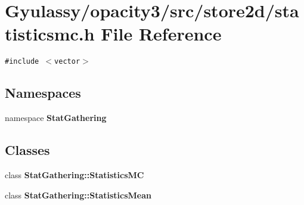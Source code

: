 \section{Gyulassy/opacity3/src/store2d/statisticsmc.h File Reference}
\label{statisticsmc_8h}
{\tt \#include $<$vector$>$}\par
\subsection*{Namespaces}
\begin{CompactItemize}
\item 
namespace {\bf StatGathering}
\end{CompactItemize}
\subsection*{Classes}
\begin{CompactItemize}
\item 
class {\bf StatGathering::StatisticsMC}
\item 
class {\bf StatGathering::StatisticsMean}
\end{CompactItemize}

